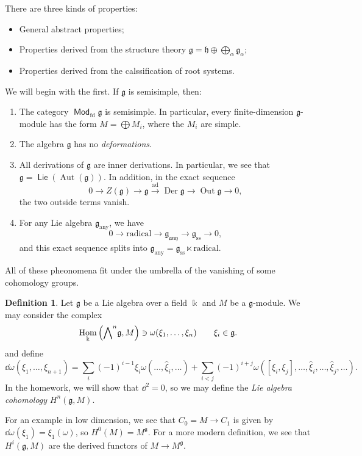 \documentclass[leqno, openany]{memoir}
\theoremstyle{definition}
\newtheorem{defn}[thm]{Definition}
\theoremstyle{remark}
\theoremstyle{plain}
\theoremstyle{definition}
\theoremstyle{remark}
\renewcommand{\k}{\Bbbk}
\newcommand{\mf}[1]{\mathfrak{#1}}
\newcommand{\mr}[1]{\mathrm{#1}}
\newcommand{\wh}[1]{\widehat{#1}}
\DeclareMathOperator{\Hom}{Hom}
\DeclareMathOperator{\ad}{ad}
\DeclareMathOperator{\Aut}{Aut}
\DeclareMathOperator{\Lie}{\mathsf{Lie}}
\DeclareMathOperator{\Mod}{\mathsf{Mod}}
\begin{document}
There are three kinds of properties:
\begin{itemize}
    \item General abstract properties;
    \item Properties derived from the structure theory $\mf{g} = \mf{h} \oplus \bigoplus_{\alpha} \mf{g}_{\alpha}$;
    \item Properties derived from the calssification of root systems.
\end{itemize}

We will begin with the first. If $\mf{g}$ is semisimple, then:
\begin{enumerate}
    \item The category $\Mod_{\mr{fd}} \mf{g}$ is semisimple. In particular, every finite-dimension $\mf{g}$-module has the form $M = \bigoplus M_i$, where the $M_i$ are simple.
    \item The algebra $\mf{g}$ has no \textit{deformations}. 
    \item All derivations of $\mf{g}$ are inner derivations. In particular, we see that $\mf{g} = \Lie(\Aut(\mf{g}))$. In addition, in the exact sequence
        \[ 0 \to Z(\mf{g}) \to \mf{g} \xrightarrow{\ad} \operatorname{Der} \mf{g} \to \operatorname{Out} \mf{g} \to 0, \]
        the two outside terms vanish.
    \item For any Lie algebra $\mf{g}_{\mr{any}}$, we have
        \[ 0 \to \text{radical} \to \mf{g}_{\mf{any}} \to \mf{g}_{\mr{ss}} \to 0, \]
        and this exact sequence splits into $\mf{g}_{\mr{any}} = \mf{g}_{\mr{ss}} \ltimes \text{radical}$.
\end{enumerate}
All of these pheonomena fit under the umbrella of the vanishing of some cohomology groups.

\begin{defn}
    Let $\mf{g}$ be a Lie algebra over a field $\k$ and $M$ be a $\mf{g}$-module. We may consider the complex
    \[ \Hom_{\k} \qty({\bigwedge}^n \mf{g}, M) \ni \omega(\xi_1, \ldots, \xi_n) \qquad \xi_i \in \mf{g}. \]
    and define
    \[ \dd{\omega}(\xi_1, \ldots, \xi_{n+1}) = \sum_i {(-1)}^{i-1} \xi_i \omega (\ldots, \wh{\xi}_i, \ldots) + \sum_{i < j} {(-1)}^{i+j} \omega ([\xi_i, \xi_j], \ldots, \wh{\xi}_i, \ldots, \wh{\xi}_j, \ldots). \]
    In the homework, we will show that $\dd^2 = 0$, so we may define the \textit{Lie algebra cohomology} $H^n(\mf{g}, M)$.
\end{defn}

For an example in low dimension, we see that $C_0 = M \to C_1$ is given by $\dd{\omega} (\xi_1) = \xi_1 (\omega)$, so $H^0(M) = M^{\mf{g}}$. For a more modern definition, we see that $H^i(\mf{g}, M)$ are the derived functors of $M \to M^{\mf{g}}$.
\end{document}
